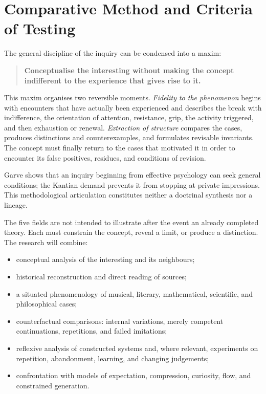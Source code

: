 \documentclass[11pt,a4paper]{article}
\begin{document}
\section{Comparative Method and Criteria of Testing}

The general discipline of the inquiry can be condensed into a maxim:

\begin{quote}
\textbf{Conceptualise the interesting without making the concept indifferent to
the experience that gives rise to it.}
\end{quote}

This maxim organises two reversible moments. \emph{Fidelity to the phenomenon}
begins with encounters that have actually been experienced and describes the
break with indifference, the orientation of attention, resistance, grip, the
activity triggered, and then exhaustion or renewal. \emph{Extraction of
structure} compares the cases, produces distinctions and counterexamples, and
formulates revisable invariants. The concept must finally return to the cases
that motivated it in order to encounter its false positives, residues, and
conditions of revision.

Garve shows that an inquiry beginning from effective psychology can seek general
conditions; the Kantian demand prevents it from stopping at private impressions.
This methodological articulation constitutes neither a doctrinal synthesis nor
a lineage.

The five fields are not intended to illustrate after the event an already
completed theory. Each must constrain the concept, reveal a limit, or produce a
distinction. The research will combine:

\begin{itemize}
  \item conceptual analysis of the interesting and its neighbours;
  \item historical reconstruction and direct reading of sources;
  \item a situated phenomenology of musical, literary, mathematical,
        scientific, and philosophical cases;
  \item counterfactual comparisons: internal variations, merely competent
        continuations, repetitions, and failed imitations;
  \item reflexive analysis of constructed systems and, where relevant,
        experiments on repetition, abandonment, learning, and changing
        judgements;
  \item confrontation with models of expectation, compression, curiosity,
        flow, and constrained generation.
\end{itemize}
\end{document}
